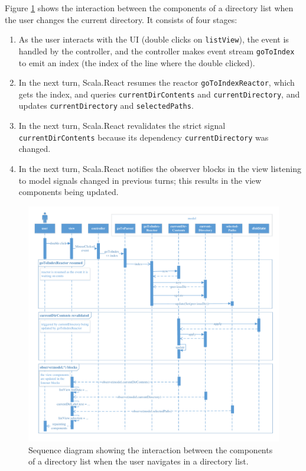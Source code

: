 Figure \ref{fig:scomm_event_propagation} shows the interaction between the components of a directory list when the user changes the current directory. It consists of four stages:
\begin{enumerate}
\item As the user interacts with the UI (double clicks on \texttt{listView}), the event is handled by the controller, and the controller makes event stream \texttt{goToIndex} to emit an index (the index of the line where the double clicked).
\item In the next turn, Scala.React resumes the reactor \texttt{goToIndexReactor}, which gets the index, and queries \texttt{currentDirContents} and \texttt{currentDirectory}, and updates \texttt{currentDirectory} and \texttt{selectedPaths}.
\item In the next turn, Scala.React revalidates the strict signal \texttt{currentDirContents} because its dependency \texttt{currentDirectory} was changed.
\item In the next turn, Scala.React notifies the observer blocks in the view listening to model signals   changed in previous turns; this results in the view components being updated.
\end{enumerate}

\begin{figure}[h!]
\centering
  \includegraphics[width=1\textwidth]{images/scomm-event-propagation.pdf}
\caption{Sequence diagram showing the interaction between the components of a directory list when the user navigates in a directory list.}
\label{fig:scomm_event_propagation}
\end{figure}


